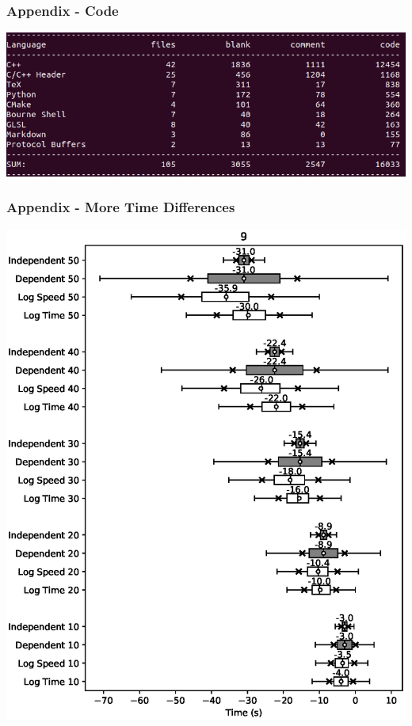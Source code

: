 \documentclass{beamer}
\begin{document}
	\begin{frame}
		\frametitle{Appendix - Code}
		\includegraphics[width=\textwidth,height=\textheight,keepaspectratio]{cloc.png}
	\end{frame}
	\begin{frame}
		\frametitle{Appendix - More Time Differences}
		\hspace{1.6cm}\includegraphics[height=0.8\textheight]{9.eps}
	\end{frame}
\end{document}
